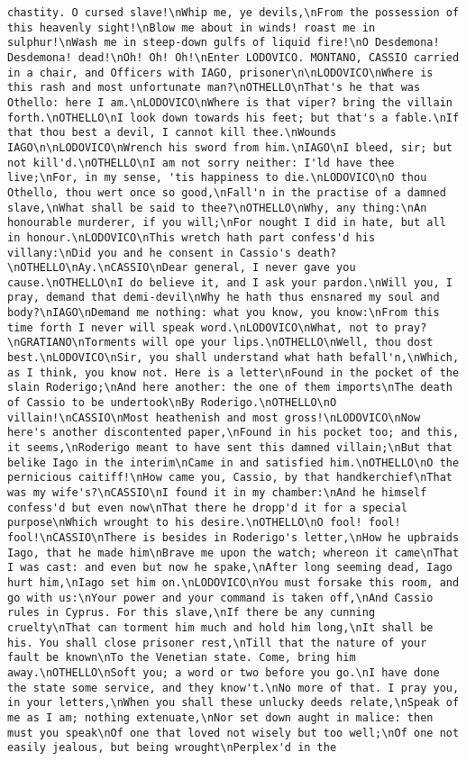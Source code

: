 \begin{verbatim}
chastity. O cursed slave!\nWhip me, ye devils,\nFrom the possession of this heavenly sight!\nBlow me about in winds! roast me in sulphur!\nWash me in steep-down gulfs of liquid fire!\nO Desdemona! Desdemona! dead!\nOh! Oh! Oh!\nEnter LODOVICO. MONTANO, CASSIO carried in a chair, and Officers with IAGO, prisoner\n\nLODOVICO\nWhere is this rash and most unfortunate man?\nOTHELLO\nThat's he that was Othello: here I am.\nLODOVICO\nWhere is that viper? bring the villain forth.\nOTHELLO\nI look down towards his feet; but that's a fable.\nIf that thou best a devil, I cannot kill thee.\nWounds IAGO\n\nLODOVICO\nWrench his sword from him.\nIAGO\nI bleed, sir; but not kill'd.\nOTHELLO\nI am not sorry neither: I'ld have thee live;\nFor, in my sense, 'tis happiness to die.\nLODOVICO\nO thou Othello, thou wert once so good,\nFall'n in the practise of a damned slave,\nWhat shall be said to thee?\nOTHELLO\nWhy, any thing:\nAn honourable murderer, if you will;\nFor nought I did in hate, but all in honour.\nLODOVICO\nThis wretch hath part confess'd his villany:\nDid you and he consent in Cassio's death?\nOTHELLO\nAy.\nCASSIO\nDear general, I never gave you cause.\nOTHELLO\nI do believe it, and I ask your pardon.\nWill you, I pray, demand that demi-devil\nWhy he hath thus ensnared my soul and body?\nIAGO\nDemand me nothing: what you know, you know:\nFrom this time forth I never will speak word.\nLODOVICO\nWhat, not to pray?\nGRATIANO\nTorments will ope your lips.\nOTHELLO\nWell, thou dost best.\nLODOVICO\nSir, you shall understand what hath befall'n,\nWhich, as I think, you know not. Here is a letter\nFound in the pocket of the slain Roderigo;\nAnd here another: the one of them imports\nThe death of Cassio to be undertook\nBy Roderigo.\nOTHELLO\nO villain!\nCASSIO\nMost heathenish and most gross!\nLODOVICO\nNow here's another discontented paper,\nFound in his pocket too; and this, it seems,\nRoderigo meant to have sent this damned villain;\nBut that belike Iago in the interim\nCame in and satisfied him.\nOTHELLO\nO the pernicious caitiff!\nHow came you, Cassio, by that handkerchief\nThat was my wife's?\nCASSIO\nI found it in my chamber:\nAnd he himself confess'd but even now\nThat there he dropp'd it for a special purpose\nWhich wrought to his desire.\nOTHELLO\nO fool! fool! fool!\nCASSIO\nThere is besides in Roderigo's letter,\nHow he upbraids Iago, that he made him\nBrave me upon the watch; whereon it came\nThat I was cast: and even but now he spake,\nAfter long seeming dead, Iago hurt him,\nIago set him on.\nLODOVICO\nYou must forsake this room, and go with us:\nYour power and your command is taken off,\nAnd Cassio rules in Cyprus. For this slave,\nIf there be any cunning cruelty\nThat can torment him much and hold him long,\nIt shall be his. You shall close prisoner rest,\nTill that the nature of your fault be known\nTo the Venetian state. Come, bring him away.\nOTHELLO\nSoft you; a word or two before you go.\nI have done the state some service, and they know't.\nNo more of that. I pray you, in your letters,\nWhen you shall these unlucky deeds relate,\nSpeak of me as I am; nothing extenuate,\nNor set down aught in malice: then must you speak\nOf one that loved not wisely but too well;\nOf one not easily jealous, but being wrought\nPerplex'd in the 
\end{verbatim}
